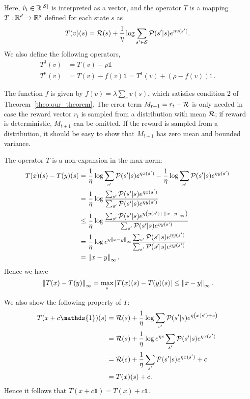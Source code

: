 Here, $\hat v_t\in\mathbb{R}^{\lvert\mathcal{S}\rvert}$ is interpreted as a vector, and the operator $T$ is a mapping $T:\mathbb{R}^d\rightarrow\mathbb{R}^d$ defined for each state $s$ as
\begin{equation*}
    T(v)(s) = \mathcal{R}(s) + \frac 1 \eta \log \sum_{s'\in\mathcal{S}} \mathcal{P}(s'|s) e^{ \eta v(s') }.
\end{equation*}
We also define the following operators, 
\begin{align*}
    T^1(v) &= T(v) - \rho\mathds{1} \\
    T^2(v) &= T(v) - f(v)\mathds{1} =  T^1(v) + (\rho - f(v))\mathds{1}.
\end{align*}

The function $f$ is given by $f(v) = \lambda\sum_s v(s)$, which satisfies condition 2 of Theorem~\ref{theo:our_theorem}. The error term $M_{t+1}=r_t-\mathcal{R}$ is only needed in case the reward vector $r_t$ is sampled from a distribution with mean $\mathcal{R}$; if reward is deterministic, $M_{t+1}$ can be omitted. If the reward is sampled from a distribution, it should be easy to show that $M_{t+1}$ has zero mean and bounded variance.

The operator $T$ is a non-expansion in the max-norm:
\begin{align*}
T(x)(s) - T(y)(s) &= \frac 1 \eta \log \sum_{s'} \mathcal{P}(s'|s) e^{\eta x(s')} - \frac 1 \eta \log \sum_{s'} \mathcal{P}(s'|s) e^{\eta y(s')}\\
 &= \frac 1 \eta \log \frac {\sum_{s'} \mathcal{P}(s'|s) e^{\eta x(s')}} {\sum_{s'} \mathcal{P}(s'|s) e^{\eta y(s')}}\\
 &\leq \frac 1 \eta \log \frac {\sum_{s'} \mathcal{P}(s'|s) e^{\eta \left( y(s') + \left\|x-y\right\|_\infty \right)}} {\sum_{s'} \mathcal{P}(s'|s) e^{\eta y(s')}}\\
 &= \frac 1 \eta \log e^{\eta \left\|x-y\right\|_\infty } \frac {\sum_{s'} \mathcal{P}(s'|s) e^{\eta y(s')}} {\sum_{s'} \mathcal{P}(s'|s) e^{\eta y(s')}}\\
 &= \left\|x - y\right\|_\infty.
\end{align*}
Hence we have
\[
\left\|T(x)-T(y)\right\|_\infty = \max_s |T(x)(s) - T(y)(s)| \leq \left\|x - y\right\|_\infty.
\]

We also show the following property of $T$:
\begin{align*}
T(x + c\mathds{1})(s) &= \cR(s) + \frac 1 \eta \log \sum_{s'} \cP(s'|s) e^{\eta \pa{ x(s') + c }}\\
 &= \cR(s) + \frac 1 \eta \log e^{\eta c} \sum_{s'} \cP(s'|s) e^{\eta x(s')}\\
 &= \cR(s) + \frac 1 \eta \sum_{s'} \cP(s'|s) e^{\eta x(s')} + c\\
 &= T(x)(s) + c.
\end{align*}
Hence it follows that $T(x + c\mathds{1}) = T(x) + c\mathds{1}$.


